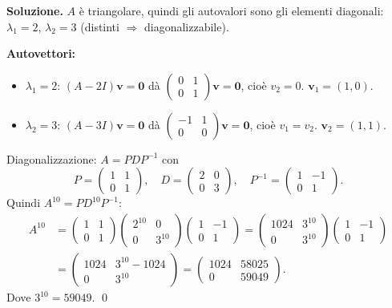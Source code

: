 \textbf{Soluzione.} $A$ è triangolare, quindi gli autovalori sono gli elementi diagonali: $\lambda_1 = 2$, $\lambda_2 = 3$ (distinti $\Rightarrow$ diagonalizzabile).

\textbf{Autovettori:}
\begin{itemize}
    \item $\lambda_1 = 2$: $(A - 2I)\mathbf{v} = \mathbf{0}$ dà $\begin{pmatrix} 0 & 1 \\ 0 & 1 \end{pmatrix}\mathbf{v} = \mathbf{0}$, cioè $v_2 = 0$. $\mathbf{v}_1 = (1,0)$.
    \item $\lambda_2 = 3$: $(A - 3I)\mathbf{v} = \mathbf{0}$ dà $\begin{pmatrix} -1 & 1 \\ 0 & 0 \end{pmatrix}\mathbf{v} = \mathbf{0}$, cioè $v_1 = v_2$. $\mathbf{v}_2 = (1,1)$.
\end{itemize}
Diagonalizzazione: $A = PDP^{-1}$ con
\[ P = \begin{pmatrix} 1 & 1 \\ 0 & 1 \end{pmatrix}, \quad D = \begin{pmatrix} 2 & 0 \\ 0 & 3 \end{pmatrix}, \quad P^{-1} = \begin{pmatrix} 1 & -1 \\ 0 & 1 \end{pmatrix}. \]
Quindi $A^{10} = PD^{10}P^{-1}$:
\begin{align*}
    A^{10} &= \begin{pmatrix} 1 & 1 \\ 0 & 1 \end{pmatrix}\begin{pmatrix} 2^{10} & 0 \\ 0 & 3^{10} \end{pmatrix}\begin{pmatrix} 1 & -1 \\ 0 & 1 \end{pmatrix} = \begin{pmatrix} 1024 & 3^{10} \\ 0 & 3^{10} \end{pmatrix}\begin{pmatrix} 1 & -1 \\ 0 & 1 \end{pmatrix} \\
    &= \begin{pmatrix} 1024 & 3^{10} - 1024 \\ 0 & 3^{10} \end{pmatrix} = \begin{pmatrix} 1024 & 58025 \\ 0 & 59049 \end{pmatrix}.
\end{align*}
Dove $3^{10} = 59049$. \qed

